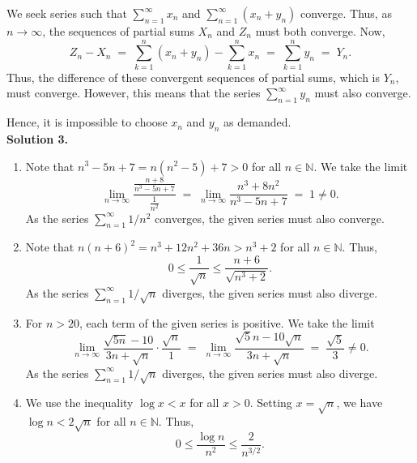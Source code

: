 \documentclass[10pt]{article}
\begin{document}
        We seek series such that $\sum_{n = 1}^\infty x_n$ and $\sum_{n = 1}^\infty (x_n + y_n)$ converge. Thus, as $n \to \infty$,
        the sequences of partial sums $X_n$ and $Z_n$ must both converge. Now, 
        \[
        Z_n - X_n \;=\;\sum_{k = 1}^n (x_n + y_n) - \sum_{k = 1}^n x_n \;=\; \sum_{k = 1}^n y_n \;=\; Y_n.
        \]
        Thus, the difference of these convergent sequences of partial sums, which is $Y_n$, must converge. However, this means that
        the series $\sum_{n = 1}^\infty y_n$ must also converge.

        Hence, it is impossible to choose $x_n$ and $y_n$ as demanded. \\

        \textbf{Solution 3.}
        \begin{enumerate}
                \item Note that $n^3 - 5n + 7 = n(n^2 - 5) + 7 > 0$ for all $n \in \mathbb{N}$.
                        We take the limit
                        \[
                        \lim_{n \to \infty} \frac{\frac{n + 8}{n^3 - 5n + 7}}{\frac{1}{n^2}} \;=\; 
                        \lim_{n \to \infty} \frac{n^3 + 8n^2}{n^3 - 5n + 7} \;=\; 1 \neq 0.
                        \]
                        As the series $\sum_{n = 1}^\infty 1 /n^2$ converges, the given series must also converge.
                \item Note that $n(n + 6)^2  = n^3 + 12n^2 + 36n > n^3 + 2$ for all $n \in \mathbb{N}$.
                        Thus,
                        \[
                                0 \le\frac{1}{\sqrt{n}} \le \frac{n + 6}{\sqrt{n^3 + 2}} .
                        \]
                        As the series $\sum_{n = 1}^\infty 1 /\sqrt{n}$ diverges, the given series must also diverge.
                \item For $n > 20$, each term of the given series is positive. We take the limit
                        \[
                        \lim_{n \to \infty} \frac{\sqrt{5n} - 10}{3n + \sqrt{n}} \cdot \frac{\sqrt{n}}{1} \;=\;
                        \lim_{n \to \infty} \frac{\sqrt{5}n - 10\sqrt{n}}{3n + \sqrt{n}} \;=\; \frac{\sqrt{5}}{3} \neq 0.
                        \]
                        As the series $\sum_{n = 1}^\infty 1 /\sqrt{n}$ diverges, the given series must also diverge.
                \item We use the inequality $\log{x} < x$ for all $x > 0$. Setting $x = \sqrt{n}$, we have $\log{n} < 2\sqrt{n}$ for all
                        $n \in \mathbb{N}$. Thus,
                        \[0 \le \frac{\log{n}}{n^2} \le \frac{2}{n^{3 /2}}.\]

\end{enumerate}
\end{document}
